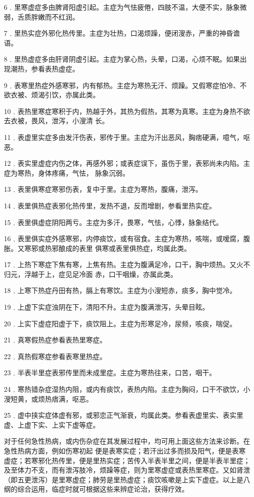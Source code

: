 \documentclass[a4paper,12pt,UTF8,twoside]{ctexbook}
\begin{document}
6﹒里寒虚症多由脾肾阳虚引起。主症为气怯疲倦，四肢不温，大便不实，脉象微弱，舌质胖嫩而不红润。

7﹒里热实症外邪化热传里。主症为壮热，口渴烦躁，便闭溲赤，严重的神昏谵语。

8﹒里热虚症多由肝肾阴虚引起。主症为掌心热，头晕，口渴，心烦不眠。如果出现潮热，参看表热虚症。

9﹒表寒里热症外感寒邪，内有郁热。主症为寒热无汗、烦躁。又假寒症怕冷、不欲衣被、烦渴引饮，亦属此类。

10﹒表热里寒症寒积于内，热越于外，其热为假热，其寒为真寒。主症为身热不欲去衣被，畏风，泄泻，小溲清
长。

11﹒表虚里实症多由发汗伤表，邪传于里。主症为汗出恶风，胸痞硬满，噫气，呕恶。

12﹒表实里虚症内伤之体，再感外邪；或表症误下，虽伤于里，表邪尚未内陷。主症为寒热，身体疼痛，气怯，
脉象沉弱。

13﹒表里俱寒症寒邪伤表，复中于里。主症为寒热，腹痛，泄泻。

14﹒表里俱热症表邪化热传里，发热不退，反而增剧，参看里热实症。

15﹒表里俱虚症阴阳两亏。主症为多汗，畏寒，气怯，心悸，脉象结代。

16﹒表里俱实症外感寒邪，内停痰饮，或有宿食。主症为寒热，咳喘，或嗳腐，腹胀。又寒邪或热邪酿成的表里
俱寒或表里俱热症，均属此类。

17﹒上热下寒症下焦有寒，上焦有热。主症为腹满足冷，口干，胸中烦热。又火不归元，浮越于上，症见足冷面
赤，口干咽燥，亦属此类。

18﹒上寒下热症丹田有热，膈上有寒饮。主症为小溲短赤，痰多，胸中觉冷。

19﹒上虚下实症浊阴在下，清阳不升。主症为腹满泄泻，头晕目眩。

20﹒上实下虚症阳虚于下，痰饮阻上。主症为形寒足冷，尿频，咳痰，喘促。

21﹒真寒假热症参看表热里寒症。

22﹒真热假寒症参看表寒里热症。

23﹒半表半里症表邪传里而未成里症。主症为寒热往来，口苦，咽干。

24﹒寒热错杂症湿热内阻，或内有痰饮，表热内陷。主症为胸闷，口干不欲饮，小溲短黄，或烦热痞满，呕恶。

25﹒虚中挟实症体虚有邪，或邪恋正气渐衰，均属此类。参看表虚里实、表实里虚、上虚下实、上实下虚等症。

对于任何急性热病，或内伤杂症在其发展过程中，均可用上面这些方法来诊断。在急性热病方面，例如伤寒初起
便是表寒实症；若汗出过多而损及阳气，便是表寒虚症；若寒邪化热传里，便是里热实症；苦传入半表半里之间，便是半表半里症；及至体力不支，而有泄泻肢冷，烦躁等症，则为里寒虚症或表热里寒症。又如肾泄（即五更泄泻）是里寒虚症；肺劳是里热虚症；痰饮咳嗽是上实下虚症。以上是八纲的综合运用，临症时就可根据这些来辨症论治，获得疗效。
\end{document}
